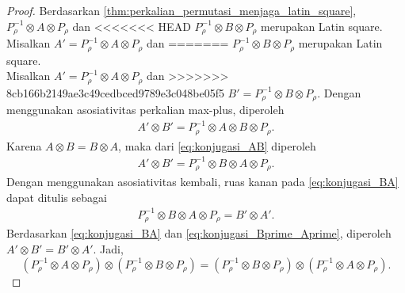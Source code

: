 \begin{proof}
  Berdasarkan \autoref{thm:perkalian_permutasi_menjaga_latin_square},
  $P_\rho^{-1}\otimes A\otimes P_\rho$ dan
<<<<<<< HEAD
  $P_\rho^{-1}\otimes B\otimes P_\rho$ merupakan Latin square. Misalkan $A'=P_\rho^{-1}\otimes A\otimes P_\rho$ dan
=======
  $P_\rho^{-1}\otimes B\otimes P_\rho$ merupakan Latin square.\\
  Misalkan $A'=P_\rho^{-1}\otimes A\otimes P_\rho$ dan
>>>>>>> 8cb166b2149ae3c49cedbced9789e3c048be05f5
  $B'=P_\rho^{-1}\otimes B\otimes P_\rho$. Dengan menggunakan asosiativitas
  perkalian max-plus, diperoleh
  \begin{align}\label{eq:konjugasi_AB}
    A'\otimes B'
    =
    P_\rho^{-1}\otimes A\otimes B\otimes P_\rho.
  \end{align}
  Karena $A\otimes B=B\otimes A$, maka dari \eqref{eq:konjugasi_AB}
  diperoleh
  \begin{align}\label{eq:konjugasi_BA}
    A'\otimes B'
    =
    P_\rho^{-1}\otimes B\otimes A\otimes P_\rho.
  \end{align}
  Dengan menggunakan asosiativitas kembali, ruas kanan pada
  \eqref{eq:konjugasi_BA} dapat ditulis sebagai
  \begin{align}\label{eq:konjugasi_Bprime_Aprime}
    P_\rho^{-1}\otimes B\otimes A\otimes P_\rho
    =
    B'\otimes A'.
  \end{align}
  Berdasarkan \eqref{eq:konjugasi_BA} dan
  \eqref{eq:konjugasi_Bprime_Aprime}, diperoleh $A'\otimes B'=B'\otimes A'$.
  Jadi,
  \[
    (P_\rho^{-1}\otimes A\otimes P_\rho)
    \otimes
    (P_\rho^{-1}\otimes B\otimes P_\rho)
    =
    (P_\rho^{-1}\otimes B\otimes P_\rho)
    \otimes
    (P_\rho^{-1}\otimes A\otimes P_\rho).
  \]
\end{proof}

